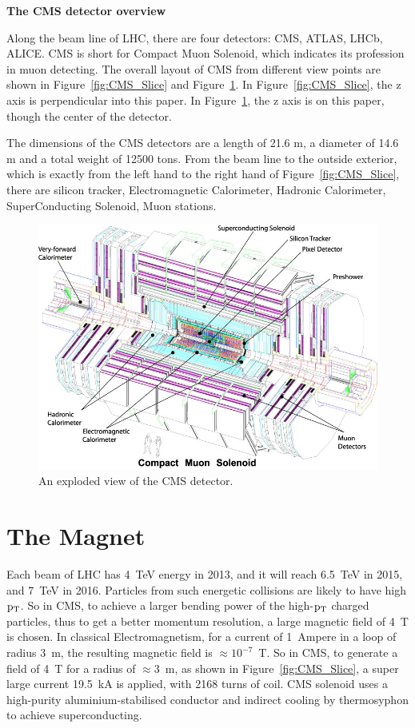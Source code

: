 {\bf The CMS detector overview}

Along the beam line of LHC, there are four detectors: CMS, ATLAS, LHCb, ALICE. 
CMS is short for Compact Muon Solenoid, which indicates its profession in muon detecting. 
The overall layout of CMS from different view points are shown in Figure~\ref{fig:CMS_Slice} and Figure~\ref{fig:CMSLayout}. 
In Figure~\ref{fig:CMS_Slice}, the z axis is perpendicular into this paper. In Figure~\ref{fig:CMSLayout}, the z axis is on this paper, though the 
center of the detector.

The dimensions of the CMS detectors are a length of 21.6 m, a diameter of 14.6 m and a total weight of 12500 tons.  
From the beam line to the outside exterior, which is exactly from the left hand to the right hand of
Figure~\ref{fig:CMS_Slice}, there are silicon tracker, Electromagnetic Calorimeter, Hadronic Calorimeter, SuperConducting Solenoid,  Muon stations. 


\begin{figure}[!htbp]
\centering
\includegraphics[width=.7\textwidth]{figures/cms_complete_layout.jpg}
\caption{An exploded view of the CMS detector.}
\label{fig:CMSLayout}
\end{figure}






\section{The Magnet}

Each beam of LHC has 4~TeV energy in 2013, and it will reach 6.5~TeV in 2015, and 7~TeV in 2016. 
Particles from such energetic collisions are likely to have high $\mathrm{p_{T}}$. 
So in CMS, to achieve a larger bending power of the high-$\mathrm{p_{T}}$ charged particles, thus to get a
better momentum resolution, a large magnetic field of 4~T is chosen. 
In classical Electromagnetism, for a current of 1~Ampere in a loop of radius 3~m, the 
resulting magnetic field is ${\approx}10^{-7}$~T. So in CMS, to generate a field of 4~T for a radius of 
${\approx}3$~m, as shown in Figure~\ref{fig:CMS_Slice}, a super large current 19.5~kA is applied, with 2168 turns of coil. CMS solenoid uses a high-purity aluminium-stabilised conductor and indirect cooling by thermosyphon to achieve superconducting. 

